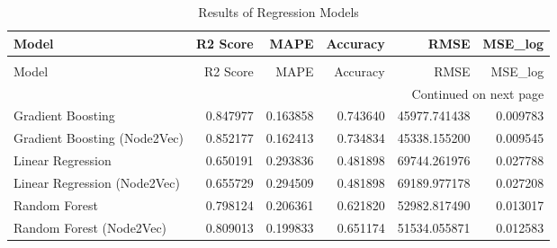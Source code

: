 \begin{longtable}{lrrrrr}
\caption{Results of Regression Models} \label{tab:regression_results} \\
\toprule
Model & R2 Score & MAPE & Accuracy & RMSE & MSE_log \\
\midrule
\endfirsthead
\caption[]{Results of Regression Models} \\
\toprule
Model & R2 Score & MAPE & Accuracy & RMSE & MSE_log \\
\midrule
\endhead
\midrule
\multicolumn{6}{r}{Continued on next page} \\
\midrule
\endfoot
\bottomrule
\endlastfoot
Gradient Boosting & 0.847977 & 0.163858 & 0.743640 & 45977.741438 & 0.009783 \\
Gradient Boosting (Node2Vec) & 0.852177 & 0.162413 & 0.734834 & 45338.155200 & 0.009545 \\
Linear Regression & 0.650191 & 0.293836 & 0.481898 & 69744.261976 & 0.027788 \\
Linear Regression (Node2Vec) & 0.655729 & 0.294509 & 0.481898 & 69189.977178 & 0.027208 \\
Random Forest & 0.798124 & 0.206361 & 0.621820 & 52982.817490 & 0.013017 \\
Random Forest (Node2Vec) & 0.809013 & 0.199833 & 0.651174 & 51534.055871 & 0.012583 \\
\end{longtable}
